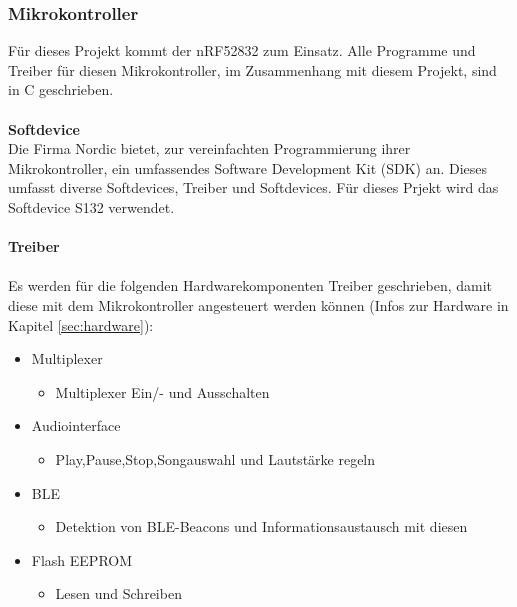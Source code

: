 \documentclass[10pt,a4paper,oneside]{99_fhnwreport}
\begin{document}
\subsubsection{Mikrokontroller}
Für dieses Projekt kommt der nRF52832 zum Einsatz. Alle Programme und Treiber für diesen Mikrokontroller, im Zusammenhang mit diesem Projekt, sind in C geschrieben.\\
\\
\textbf{Softdevice}\\
Die Firma Nordic bietet, zur vereinfachten Programmierung ihrer Mikrokontroller, ein umfassendes Software Development Kit (SDK) an. Dieses umfasst diverse Softdevices, Treiber und Softdevices. Für dieses Prjekt wird das Softdevice S132 verwendet.\\
\\
\textbf{Treiber}\\
\\
Es werden für die folgenden Hardwarekomponenten Treiber geschrieben, damit diese mit dem Mikrokontroller angesteuert werden können (Infos zur Hardware in Kapitel \ref{sec:hardware}):
\begin{itemize}
	\item{Multiplexer}
	\begin{itemize}
		\item{Multiplexer Ein/- und Ausschalten}
	\end{itemize}
\end{itemize}

\begin{itemize}
	\item{Audiointerface}
	\begin{itemize}
		\item{Play,Pause,Stop,Songauswahl und Lautstärke regeln}
	\end{itemize}
\end{itemize}

\begin{itemize}
	\item{BLE}
	\begin{itemize}
		\item{Detektion von BLE-Beacons und Informationsaustausch mit diesen}
	\end{itemize}
\end{itemize}

\begin{itemize}
	\item{Flash EEPROM}
	\begin{itemize}
		\item{Lesen und Schreiben}
	\end{itemize}
\end{itemize}
\end{document}
